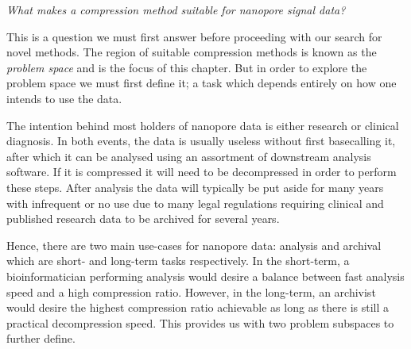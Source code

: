 

\textit{What makes a compression method suitable for nanopore signal data?}

This is a question we must first answer before proceeding with our search for
novel methods.
The region of suitable compression methods is known as the \textit{problem space} and
is the focus of this chapter. But in order to explore the problem space we must
first define it; a task which depends entirely on how one intends to use the
data.

The intention behind most holders of nanopore data is either research or
clinical diagnosis. In both events, the data is usually useless without first
basecalling it, after which it can be analysed using an assortment of downstream
analysis software.
If it is compressed it will need to be decompressed in order to
perform these steps. After analysis the data will typically be put aside for
many years with infrequent or no use due to many legal regulations requiring
clinical and published research data to be archived for several years.

Hence, there are two main use-cases for nanopore data: analysis and archival
which are short- and long-term tasks respectively. In the short-term, a
bioinformatician performing analysis would desire a balance between fast
analysis speed and a high compression ratio. However, in the long-term, an
archivist would desire the highest compression ratio achievable as long as there
is still a practical decompression speed. This provides us with two problem
subspaces to further define.

